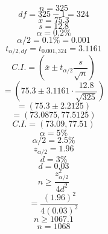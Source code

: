\documentclass{article}
\begin{document}
    $$n = 325$$
$$df = 325 - 1 = 324$$
$$\overline{x} = 75.3$$
$$s = 12.8$$
$$\alpha = 0.2\%$$
$$\alpha/2 = 0.1\% = 0.001$$
$$t_{\alpha/2, df} = t_{0.001, 324} = 3.1161$$
$$C.I. = \left(\overline{x} \pm t_{\alpha/2} \frac{s}{\sqrt{n}}\right)$$
$$= \left(75.3 \pm 3.1161 \cdot \frac{12.8}{\sqrt{325}}\right)$$
$$= (75.3 \pm 2.2125)$$
$$= (73.0875, 77.5125)$$
$$C.I. = (73.09, 77.51)$$
$$\alpha = 5\%$$
$$\alpha/2 = 2.5\%$$
$$z_{\alpha/2} = 1.96$$
$$d = 3\%$$
$$d = 0.03$$
$$n \ge \frac{z_{\alpha/2}^2}{4d^2}$$
$$= \frac{(1.96)^2}{4(0.03)^2}$$
$$n \ge 1067.1$$
$$n = 1068$$

    
\end{document}
